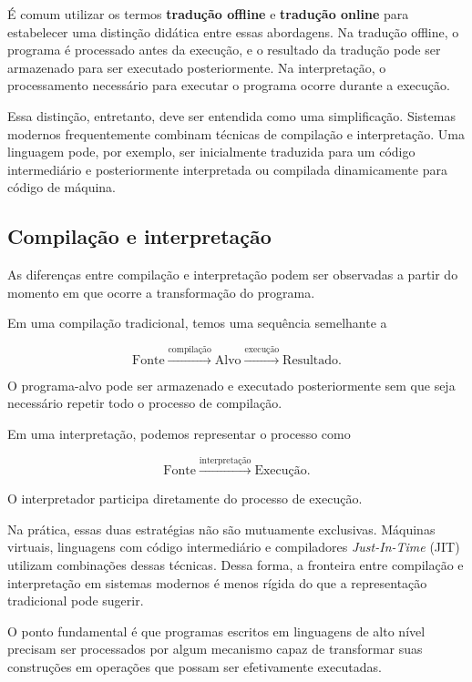 \documentclass[
  brazilian,
  letterpaper,
]{book}
\theoremstyle{plain}
\theoremstyle{definition}
\theoremstyle{remark}
\begin{document}
É comum utilizar os termos \textbf{tradução offline} e \textbf{tradução
online} para estabelecer uma distinção didática entre essas abordagens.
Na tradução offline, o programa é processado antes da execução, e o
resultado da tradução pode ser armazenado para ser executado
posteriormente. Na interpretação, o processamento necessário para
executar o programa ocorre durante a execução.

Essa distinção, entretanto, deve ser entendida como uma simplificação.
Sistemas modernos frequentemente combinam técnicas de compilação e
interpretação. Uma linguagem pode, por exemplo, ser inicialmente
traduzida para um código intermediário e posteriormente interpretada ou
compilada dinamicamente para código de máquina.

\subsection{Compilação e
interpretação}\label{compilauxe7uxe3o-e-interpretauxe7uxe3o}

As diferenças entre compilação e interpretação podem ser observadas a
partir do momento em que ocorre a transformação do programa.

Em uma compilação tradicional, temos uma sequência semelhante a

\[
\text{Fonte}
\xrightarrow{\text{compilação}}
\text{Alvo}
\xrightarrow{\text{execução}}
\text{Resultado}.
\]

O programa-alvo pode ser armazenado e executado posteriormente sem que
seja necessário repetir todo o processo de compilação.

Em uma interpretação, podemos representar o processo como

\[
\text{Fonte}
\xrightarrow{\text{interpretação}}
\text{Execução}.
\]

O interpretador participa diretamente do processo de execução.

Na prática, essas duas estratégias não são mutuamente exclusivas.
Máquinas virtuais, linguagens com código intermediário e compiladores
\emph{Just-In-Time} (JIT) utilizam combinações dessas técnicas. Dessa
forma, a fronteira entre compilação e interpretação em sistemas modernos
é menos rígida do que a representação tradicional pode sugerir.

O ponto fundamental é que programas escritos em linguagens de alto nível
precisam ser processados por algum mecanismo capaz de transformar suas
construções em operações que possam ser efetivamente executadas.
\end{document}
